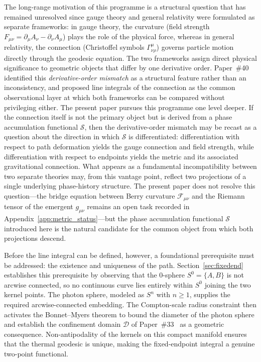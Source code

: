 \documentclass[%
 reprint, amsmath,amssymb, aps, prb, ]{revtex4-2}
\numberwithin{equation}{section}
\begin{document}
The long-range motivation of this programme is a structural question that has remained unresolved since gauge theory and general relativity were formulated as separate frameworks: in gauge theory, the curvature (field strength $F_{\mu\nu} = \partial_\mu A_\nu - \partial_\nu A_\mu$) plays the role of the physical force, whereas in general relativity, the connection (Christoffel symbols $\Gamma^\mu_{\nu\rho}$) governs particle motion directly through the geodesic equation. The two frameworks assign direct physical significance to geometric objects that differ by one derivative order. Paper~\#40~\cite{hanamura40} identified this \emph{derivative-order mismatch} as a structural feature rather than an inconsistency, and proposed line integrals of the connection as the common observational layer at which both frameworks can be compared without privileging either. The present paper pursues this programme one level deeper. If the connection itself is not the primary object but is derived from a phase accumulation functional $\mathcal{S}$, then the derivative-order mismatch may be recast as a question about the direction in which $\mathcal{S}$ is differentiated: differentiation with respect to path deformation yields the gauge connection and field strength, while differentiation with respect to endpoints yields the metric and its associated gravitational connection. What appears as a fundamental incompatibility between two separate theories may, from this vantage point, reflect two projections of a single underlying phase-history structure. The present paper does not resolve this question---the bridge equation between Berry curvature $\mathcal{F}_{\mu\nu}$ and the Riemann tensor of the emergent $g_{\mu\nu}$ remains an open task recorded in Appendix~\ref{app:metric_status}---but the phase accumulation functional $\mathcal{S}$ introduced here is the natural candidate for the common object from which both projections descend.

Before the line integral can be defined, however, a foundational prerequisite must be addressed: the existence and uniqueness of the path. Section~\ref{sec:fixedend} establishes this prerequisite by observing that the 0-sphere $S^0=\{A,B\}$ is not arcwise connected, so no continuous curve lies entirely within $S^0$ joining the two kernel points. The photon sphere, modeled as $S^n$ with $n\geq 1$, supplies the required arcwise-connected embedding. The Compton-scale radius constraint then activates the Bonnet--Myers theorem to bound the diameter of the photon sphere and establish the confinement domain $\mathcal{D}$ of Paper~\#33~\cite{hanamura33} as a geometric consequence. Non-antipodality of the kernels on this compact manifold ensures that the thermal geodesic is unique, making the fixed-endpoint integral a genuine two-point functional.
\end{document}
